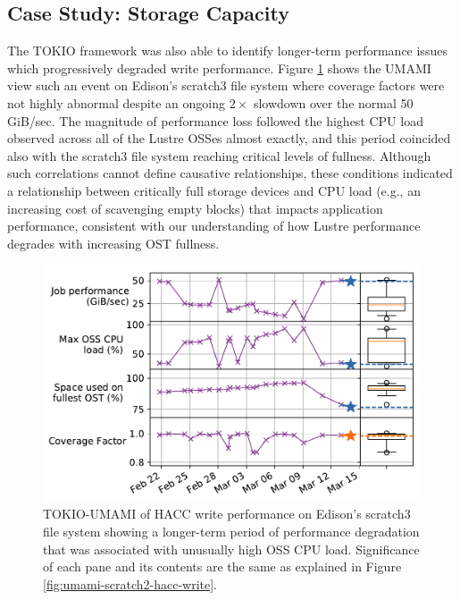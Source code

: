 \subsection{Case Study: Storage Capacity}

The TOKIO framework was also able to identify longer-term performance issues which progressively degraded write performance.
Figure \ref{fig:umami-scratch3-hacc-write-long-term} shows the UMAMI view such an event on Edison's scratch3 file system where coverage factors were not highly abnormal despite an ongoing $2\times$ slowdown over the normal 50 GiB/sec.
The magnitude of performance loss followed the highest CPU load observed across all of the Lustre OSSes almost exactly, and this period coincided also with the scratch3 file system reaching critical levels of fullness.
Although such correlations cannot define causative relationships, these conditions indicated a relationship between critically full storage devices and CPU load (e.g., an increasing cost of scavenging empty blocks) that impacts application performance, consistent with our understanding of how Lustre performance degrades with increasing OST fullness.
 
\begin{figure}[t]
    \centering
    \includegraphics[width=1.0\columnwidth]{figs/umami-scratch3-hacc-write-long-term.pdf}
    \caption{TOKIO-UMAMI of HACC write performance on Edison's scratch3 file system showing a longer-term period of performance degradation that was associated with unusually high OSS CPU load.
    Significance of each pane and its contents are the same as explained in Figure \ref{fig:umami-scratch2-hacc-write}.}
    \label{fig:umami-scratch3-hacc-write-long-term}
\vspace{-.2in}
\end{figure}
